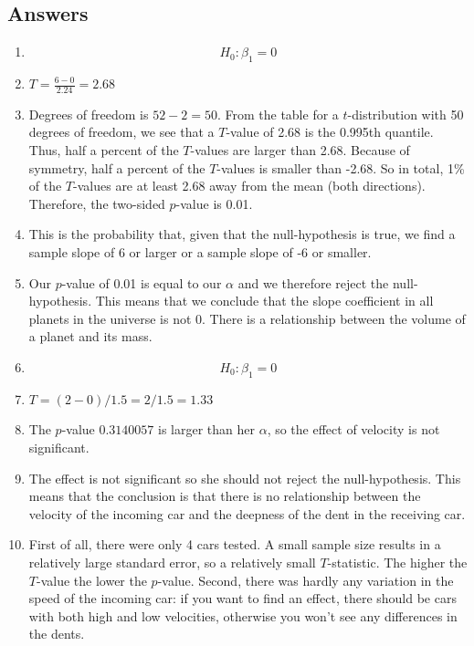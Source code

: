 \documentclass[]{book}\usepackage[]{graphicx}\usepackage[]{color}
\begin{document}
\subsection{Answers}

\begin{enumerate}

\item

\begin{equation}
H_0: \beta_1 = 0
\end{equation}



\item $T= \frac{6 - 0}{2.24}= 2.68 $

\item

Degrees of freedom is $52-2=50$. From the table for a $t$-distribution with 50 degrees of freedom, we see that a $T$-value of 2.68 is the 0.995th quantile. Thus, half a percent of the $T$-values are larger than 2.68. Because of symmetry, half a percent of the $T$-values is smaller than -2.68. So in total, 1\% of the $T$-values are at least 2.68 away from the mean (both directions). Therefore, the two-sided $p$-value is 0.01.

\item This is the probability that, given that the null-hypothesis is true, we find a sample slope of 6 or larger or a sample slope of -6 or smaller.

\item Our $p$-value of 0.01 is equal to our $\alpha$ and we therefore reject the null-hypothesis. This means that we conclude that the slope coefficient in all planets in the universe is not 0. There is a relationship between the volume of a planet and its mass.

\item

\begin{equation}
H_0: \beta_1= 0
\end{equation}

\item
$T= (2-0)/1.5=2/1.5=1.33$

\item
The $p$-value $0.3140057$ is larger than her $\alpha$, so the effect of velocity is not significant.

\item
 The effect is not significant so she should not reject the null-hypothesis. This means that the conclusion is that there is no relationship between the velocity of the incoming car and the deepness of the dent in the receiving car.

\item First of all, there were only 4 cars tested. A small sample size results in a relatively large standard error, so a relatively small $T$-statistic. The higher the $T$-value the lower the $p$-value. Second, there was hardly any variation in the speed of the incoming car: if you want to find an effect, there should be cars with both high and low velocities, otherwise you won't see any differences in the dents.

\end{enumerate}
\end{document}
